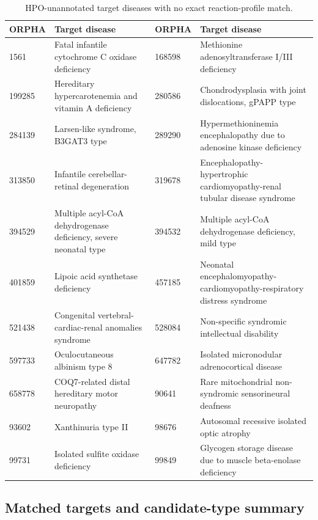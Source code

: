 \begin{table}[htbp]
\centering
\caption{HPO-unannotated target diseases with no exact reaction-profile match.}
\label{tab:supp_unmatched_targets}
\scriptsize
\setlength{\tabcolsep}{4pt}
\renewcommand{\arraystretch}{1.1}
\begin{tabularx}{\textwidth}{@{}p{}X p{}X@{}}
\toprule
\textbf{ORPHA} & \textbf{Target disease} & \textbf{ORPHA} & \textbf{Target disease}  \\
\midrule
1561 & Fatal infantile cytochrome C oxidase deficiency & 168598 & Methionine adenosyltransferase I/III deficiency \\
199285 & Hereditary hypercarotenemia and vitamin A deficiency & 280586 & Chondrodysplasia with joint dislocations, gPAPP type \\
284139 & Larsen-like syndrome, B3GAT3 type & 289290 & Hypermethioninemia encephalopathy due to adenosine kinase deficiency \\
313850 & Infantile cerebellar-retinal degeneration & 319678 & Encephalopathy-hypertrophic cardiomyopathy-renal tubular disease syndrome \\
394529 & Multiple acyl-CoA dehydrogenase deficiency, severe neonatal type & 394532 & Multiple acyl-CoA dehydrogenase deficiency, mild type \\
401859 & Lipoic acid synthetase deficiency & 457185 & Neonatal encephalomyopathy-cardiomyopathy-respiratory distress syndrome \\
521438 & Congenital vertebral-cardiac-renal anomalies syndrome & 528084 & Non-specific syndromic intellectual disability \\
597733 & Oculocutaneous albinism type 8 & 647782 & Isolated micronodular adrenocortical disease \\
658778 & COQ7-related distal hereditary motor neuropathy & 90641 & Rare mitochondrial non-syndromic sensorineural deafness \\
93602 & Xanthinuria type II & 98676 & Autosomal recessive isolated optic atrophy \\
99731 & Isolated sulfite oxidase deficiency & 99849 & Glycogen storage disease due to muscle beta-enolase deficiency \\
\bottomrule
\end{tabularx}
\end{table}

\subsection{Matched targets and candidate-type summary}
\label{supsec:matched_target_summary}

